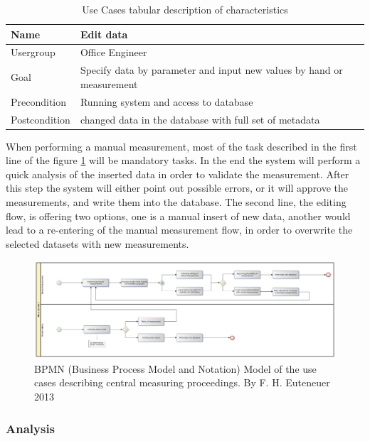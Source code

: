 \begin{table}[H]
\centering
\begin{tabular}{l | p{11cm}}
Name & Edit data\\ \hline 
Usergroup & Office Engineer\\ \hline 
Goal & Specify data by parameter and input new values by hand or measurement\\ \hline 
Precondition & Running system and access to database\\ \hline 
Postcondition & changed data in the database with full set of metadata\\ 
\end{tabular}
\caption{Use Cases tabular description of characteristics} 
\label{table:use case description of "Edit data"}
\end{table}

When performing a manual measurement, most of the task described in the first line of the figure \ref{fig:bpmn_use-case_measuring} will be mandatory tasks. In the end the system will perform a quick analysis of the inserted data in order to validate the measurement. After this step the system will either point out possible errors, or it will approve the measurements, and write them into the database. The second line, the editing flow, is offering two options, one is a manual insert of new data, another would lead to a re-entering of the manual measurement flow, in order to overwrite the selected datasets with new measurements.

\begin{figure}[H]
	\centering
 	 \includegraphics[scale=0.24]{graphics/bpmn_use-cases_measurement.jpg} 
	\caption{BPMN (Business Process Model and Notation) Model of the use cases describing central measuring proceedings. By F. H. Euteneuer 2013}
	 \label{fig:bpmn_use-case_measuring}
\end{figure}

\subsubsection{Analysis}

